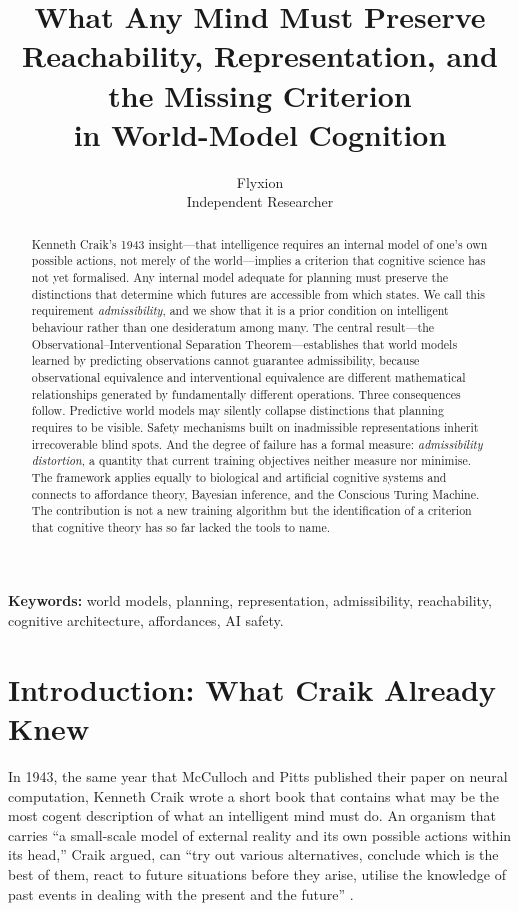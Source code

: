 \documentclass[11pt,a4paper]{article}
\title{\textbf{What Any Mind Must Preserve}\\[4pt]
  {\large Reachability, Representation, and the Missing Criterion\\
  in World-Model Cognition}}
\author{Flyxion\\
  \small Independent Researcher}
\date{}
\begin{document}
\maketitle

\begin{abstract}
\noindent
Kenneth Craik's 1943 insight---that intelligence requires an internal model
of one's own possible actions, not merely of the world---implies a criterion
that cognitive science has not yet formalised. Any internal model adequate for
planning must preserve the distinctions that determine which futures are
accessible from which states. We call this requirement \emph{admissibility},
and we show that it is a prior condition on intelligent behaviour rather than
one desideratum among many. The central result---the Observational--Interventional
Separation Theorem---establishes that world models learned by predicting
observations cannot guarantee admissibility, because observational equivalence
and interventional equivalence are different mathematical relationships generated
by fundamentally different operations. Three consequences follow. Predictive
world models may silently collapse distinctions that planning requires to be
visible. Safety mechanisms built on inadmissible representations inherit
irrecoverable blind spots. And the degree of failure has a formal measure:
\emph{admissibility distortion}, a quantity that current training objectives
neither measure nor minimise. The framework applies equally to biological and
artificial cognitive systems and connects to affordance theory, Bayesian
inference, and the Conscious Turing Machine. The contribution is not a new
training algorithm but the identification of a criterion that cognitive theory
has so far lacked the tools to name.
\end{abstract}

\noindent\textbf{Keywords:} world models, planning, representation, admissibility,
reachability, cognitive architecture, affordances, AI safety.

\bigskip

\section{Introduction: What Craik Already Knew}

In 1943, the same year that McCulloch and Pitts published their paper on neural
computation, Kenneth Craik wrote a short book that contains what may be the most
cogent description of what an intelligent mind must do. An organism that carries
``a small-scale model of external reality and its own possible actions within its
head,'' Craik argued, can ``try out various alternatives, conclude which is the
best of them, react to future situations before they arise, utilise the knowledge
of past events in dealing with the present and the future'' \citep{craik1943nature}.
\end{document}
